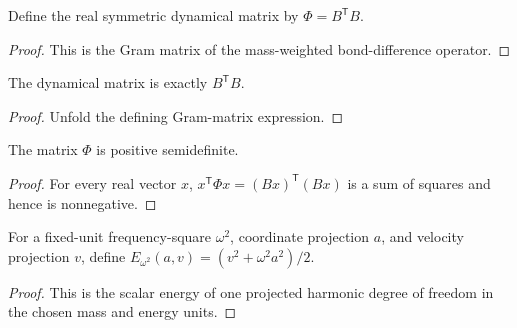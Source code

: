 \begin{definition}
\label{def:harmonic:mass-weighted-harmonic-matrix}
Define the real symmetric dynamical matrix by $\Phi=B^{\mathsf T}B$.
\end{definition}
\begin{proof}

\leanok
This is the Gram matrix of the mass-weighted bond-difference operator.
\end{proof}

\begin{theorem}
\label{thm:harmonic:gram-factorization}
The dynamical matrix is exactly $B^{\mathsf T}B$.
\end{theorem}
\begin{proof}

\leanok
Unfold the defining Gram-matrix expression.
\end{proof}

\begin{theorem}
\label{thm:harmonic:matrix-pos-semidef}
The matrix $\Phi$ is positive semidefinite.
\end{theorem}
\begin{proof}

\leanok
For every real vector $x$, $x^{\mathsf T}\Phi x=(Bx)^{\mathsf T}(Bx)$ is a
sum of squares and hence is nonnegative.
\end{proof}

\begin{definition}
\label{def:harmonic:modal-energy-api}
For a fixed-unit frequency-square $\omega^2$, coordinate projection $a$, and
velocity projection $v$, define $E_{\omega^2}(a,v)=(v^2+\omega^2a^2)/2$.
\end{definition}
\begin{proof}

\leanok
This is the scalar energy of one projected harmonic degree of freedom in the
chosen mass and energy units.
\end{proof}

